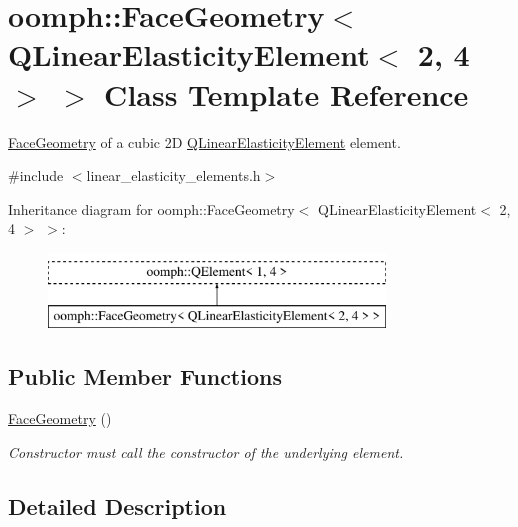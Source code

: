 \hypertarget{classoomph_1_1FaceGeometry_3_01QLinearElasticityElement_3_012_00_014_01_4_01_4}{}\section{oomph\+:\+:Face\+Geometry$<$ Q\+Linear\+Elasticity\+Element$<$ 2, 4 $>$ $>$ Class Template Reference}
\label{classoomph_1_1FaceGeometry_3_01QLinearElasticityElement_3_012_00_014_01_4_01_4}


\hyperlink{classoomph_1_1FaceGeometry}{Face\+Geometry} of a cubic 2D \hyperlink{classoomph_1_1QLinearElasticityElement}{Q\+Linear\+Elasticity\+Element} element.  




{\ttfamily \#include $<$linear\+\_\+elasticity\+\_\+elements.\+h$>$}

Inheritance diagram for oomph\+:\+:Face\+Geometry$<$ Q\+Linear\+Elasticity\+Element$<$ 2, 4 $>$ $>$\+:\begin{figure}[H]
\begin{center}
\leavevmode
\includegraphics[height=2.000000cm]{classoomph_1_1FaceGeometry_3_01QLinearElasticityElement_3_012_00_014_01_4_01_4}
\end{center}
\end{figure}
\subsection*{Public Member Functions}
\begin{DoxyCompactItemize}
\item 
\hyperlink{classoomph_1_1FaceGeometry_3_01QLinearElasticityElement_3_012_00_014_01_4_01_4_addf03636ffdb4240ccb8126f4aaaacd2}{Face\+Geometry} ()
\begin{DoxyCompactList}\small\item\em Constructor must call the constructor of the underlying element. \end{DoxyCompactList}\end{DoxyCompactItemize}


\subsection{Detailed Description}
